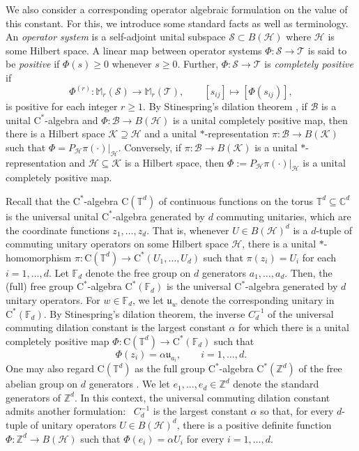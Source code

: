 \documentclass[10pt]{amsart}
\newcommand{\bC}{{\mathbb{C}}}
\newcommand{\bF}{{\mathbb{F}}}
\newcommand{\bM}{{\mathbb{M}}}
\newcommand{\bT}{{\mathbb{T}}}
\newcommand{\bZ}{{\mathbb{Z}}}
\newcommand{\B}{{\mathcal{B}}}
\renewcommand{\H}{{\mathcal{H}}}
\newcommand{\K}{{\mathcal{K}}}
\renewcommand{\S}{{\mathcal{S}}}
\newcommand{\T}{{\mathcal{T}}}
\newcommand{\rC}{\mathrm{C}}
\begin{document}
We also consider a corresponding operator algebraic formulation on the value of this constant. For this, we introduce some standard facts as well as terminology. An \emph{operator system} is a self-adjoint unital subspace $\S\subset B(\H)$ where $\H$ is some Hilbert space. A linear map between operator systems $\Phi:\S\rightarrow\T$ is said to be \emph{positive} if $\Phi(s)\geq 0$ whenever $s\geq 0$. Further, $\Phi:\S\rightarrow\T$ is \emph{completely positive} if
\[
    \Phi^{(r)}:\bM_r(\S)\longrightarrow\bM_r(\T), \qquad [s_{ij}]\longmapsto [\Phi(s_{ij})],
\]
is positive for each integer $r\geq 1$. By Stinespring's dilation theorem \cite{stinespring1955positive}, if $\B$ is a unital $\rC^*$-algebra and $\Phi:\B\rightarrow B(\H)$ is a unital completely positive map, then there is a Hilbert space $\K\supseteq\H$ and a unital $*$-representation $\pi:\B\rightarrow B(\K)$ such that $\Phi = P_\H \pi(\cdot)|_\H$. Conversely, if $\pi:\B\rightarrow B(\K)$ is a unital $*$-representation and $\H\subseteq\K$ is a Hilbert space, then $\Phi:=P_\H \pi(\cdot)|_\H$ is a unital completely positive map.

Recall that the $\rC^*$-algebra $\rC(\bT^d)$ of continuous functions on the torus $\bT^d\subseteq\bC^d$ is the universal unital $\rC^*$-algebra generated by $d$ commuting unitaries, which are the coordinate functions $z_1,\ldots, z_d$. That is, whenever $U\in B(\H)^d$ is a $d$-tuple of commuting unitary operators on some Hilbert space $\H$, there is a unital $*$-homomorphism $\pi:\rC(\bT^d)\rightarrow \rC^*(U_1,\ldots, U_d)$ such that $\pi(z_i) = U_i$ for each $i=1,\ldots, d$. Let $\bF_d$ denote the free group on $d$ generators $a_1,\ldots, a_d$. Then, the (full) free group $\rC^*$-algebra $\rC^*(\bF_d)$ is the universal $\rC^*$-algebra generated by $d$ unitary operators. For $w\in\bF_d$, we let $\mathfrak{u}_w$ denote the corresponding unitary in $\rC^*(\bF_d)$. By Stinespring's dilation theorem, the inverse $C_d^{-1}$ of the universal commuting dilation constant is the largest constant $\alpha$ for which there is a unital completely positive map $\Phi:\rC(\bT^d) \rightarrow\rC^*(\bF_d)$ such that
\[
    \Phi(z_i) = \alpha \mathfrak{u}_{a_i}, \qquad i=1,\ldots, d.
\]
One may also regard $\rC(\bT^d)$ as the full group $\rC^*$-algebra $\rC^*(\bZ^d)$ of the free abelian group on $d$ generators \cite[Example 2.5.1]{brown2008textrm}. We let $e_1,\ldots, e_d\in\bZ^d$ denote the standard generators of $\bZ^d$. In this context, the universal commuting dilation constant admits another formulation:~ $C_d^{-1}$ is the largest constant $\alpha$ so that, for every $d$-tuple of unitary operators $U\in B(\H)^d$, there is a positive definite function $\Phi:\bZ^d \rightarrow B(\H)$ such that $\Phi(e_i) = \alpha U_i$ for every $i=1,\ldots, d$.
\end{document}
